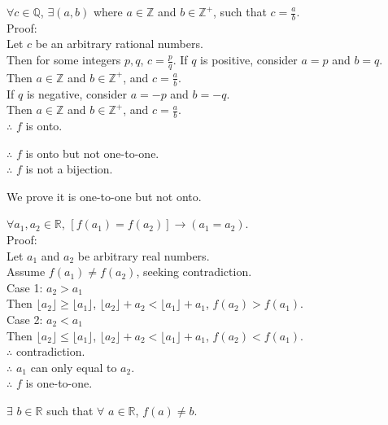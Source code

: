 \documentclass[12pt]{exam}
\begin{document}
\begin{solution}
\begin{qparts}
\begin{subparts}
            $\forall c \in \mathbb{Q}$, $\exists (a, b)$ where $a\in \mathbb{Z}$ 
            and $b\in\mathbb{Z^+}$, such that $c = \frac{a}{b}$.\\
            Proof:\\
            Let $c$ be an arbitrary rational numbers.\\
            Then for some integers $p,q$, $c = \frac{p}{q}$.
            If $q$ is positive, consider $a = p$ and $b = q$.\\
            Then $a \in \mathbb{Z}$ and $b \in \mathbb{Z^+}$, and $c = \frac{a}{b}$.\\
            If $q$ is negative, consider $a = -p$ and $b = -q$.\\
            Then $a \in \mathbb{Z}$ and $b \in \mathbb{Z^+}$, and $c = \frac{a}{b}$.\\
            $\therefore$ $f$ is onto.
        \end{subparts}
        $\therefore$ $f$ is onto but not one-to-one.\\
        $\therefore$ $f$ is not a bijection.
        \item
        We prove it is one-to-one but not onto.
        \begin{subparts}
            \item
            $\forall a_1, a_2 \in \mathbb{R}$, $[f(a_1) = f(a_2)] \rightarrow (a_1 = a_2)$.\\
            Proof:\\
            Let $a_1$ and $a_2$ be arbitrary real numbers.\\
            Assume $f(a_1) \not = f(a_2)$, seeking contradiction.\\
            Case 1: $a_2 > a_1$\\
            Then $\lfloor a_2 \rfloor \geq \lfloor a_1 \rfloor$,
            $\lfloor a_2 \rfloor + a_2 < \lfloor a_1 \rfloor + a_1$, $f(a_2) > f(a_1)$.\\
            Case 2: $a_2 < a_1$\\
            Then $\lfloor a_2 \rfloor \leq \lfloor a_1 \rfloor$,
            $\lfloor a_2 \rfloor + a_2 < \lfloor a_1 \rfloor + a_1$, $f(a_2) < f(a_1)$.\\
            $\therefore$ contradiction.\\
            $\therefore$ $a_1$ can only equal to $a_2$.\\
            $\therefore$ $f$ is one-to-one.
            \item
            $\exists$ $b \in \mathbb{R}$ such that $\forall$ $a \in \mathbb{R}$, $f(a) \not = b$.\\

\end{subparts}
\end{qparts}
\end{solution}
\end{document}
